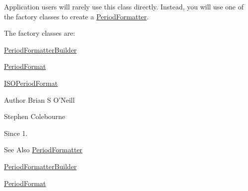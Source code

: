 Application users will rarely use this class directly. Instead, you will use one of the factory classes to create a \hyperlink{classorg_1_1joda_1_1time_1_1format_1_1_period_formatter}{Period\-Formatter}. 

The factory classes are\-:\par

\begin{DoxyItemize}
\item \hyperlink{classorg_1_1joda_1_1time_1_1format_1_1_period_formatter_builder}{Period\-Formatter\-Builder}\par

\item \hyperlink{classorg_1_1joda_1_1time_1_1format_1_1_period_format}{Period\-Format}\par

\item \hyperlink{classorg_1_1joda_1_1time_1_1format_1_1_i_s_o_period_format}{I\-S\-O\-Period\-Format}\par

\end{DoxyItemize}

\begin{DoxyAuthor}{Author}
Brian S O'Neill 

Stephen Colebourne 
\end{DoxyAuthor}
\begin{DoxySince}{Since}
1. 
\end{DoxySince}
\begin{DoxySeeAlso}{See Also}
\hyperlink{classorg_1_1joda_1_1time_1_1format_1_1_period_formatter}{Period\-Formatter} 

\hyperlink{classorg_1_1joda_1_1time_1_1format_1_1_period_formatter_builder}{Period\-Formatter\-Builder} 

\hyperlink{classorg_1_1joda_1_1time_1_1format_1_1_period_format}{Period\-Format} 
\end{DoxySeeAlso}


